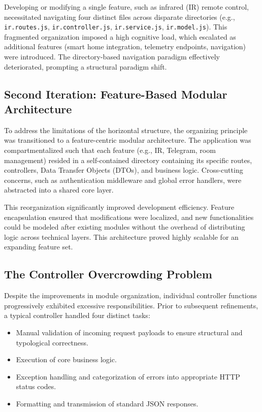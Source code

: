 Developing or modifying a single feature, such as infrared (IR) remote control, necessitated navigating four distinct files across disparate directories (e.g., \texttt{ir.routes.js}, \texttt{ir.controller.js}, \texttt{ir.service.js}, \texttt{ir.model.js}). This fragmented organization imposed a high cognitive load, which escalated as additional features (smart home integration, telemetry endpoints, navigation) were introduced. The directory-based navigation paradigm effectively deteriorated, prompting a structural paradigm shift.

\subsection{Second Iteration: Feature-Based Modular Architecture}
\label{sec:ch8_feature_based}

To address the limitations of the horizontal structure, the organizing principle was transitioned to a feature-centric modular architecture. The application was compartmentalized such that each feature (e.g., IR, Telegram, room management) resided in a self-contained directory containing its specific routes, controllers, Data Transfer Objects (DTOs), and business logic. Cross-cutting concerns, such as authentication middleware and global error handlers, were abstracted into a shared core layer.

This reorganization significantly improved development efficiency. Feature encapsulation ensured that modifications were localized, and new functionalities could be modeled after existing modules without the overhead of distributing logic across technical layers. This architecture proved highly scalable for an expanding feature set.

\subsection{The Controller Overcrowding Problem}
\label{sec:ch8_overcrowding}

Despite the improvements in module organization, individual controller functions progressively exhibited excessive responsibilities. Prior to subsequent refinements, a typical controller handled four distinct tasks:

\begin{itemize}
\item Manual validation of incoming request payloads to ensure structural and typological correctness.
    \item Execution of core business logic.
    \item Exception handling and categorization of errors into appropriate HTTP status codes.
    \item Formatting and transmission of standard JSON responses.
\end{itemize}

